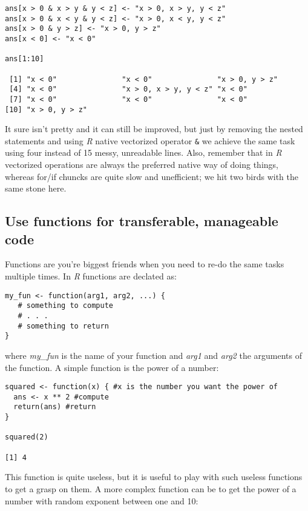 \documentclass{book}
\begin{document}
\begin{lstlisting}[showstringspaces=false]
ans[x > 0 & x > y & y < z] <- "x > 0, x > y, y < z"
ans[x > 0 & x < y & y < z] <- "x > 0, x < y, y < z"
ans[x > 0 & y > z] <- "x > 0, y > z"
ans[x < 0] <- "x < 0"

ans[1:10]

 [1] "x < 0"               "x < 0"               "x > 0, y > z"       
 [4] "x < 0"               "x > 0, x > y, y < z" "x < 0"              
 [7] "x < 0"               "x < 0"               "x < 0"              
[10] "x > 0, y > z"   
\end{lstlisting}

It sure isn't pretty and it can still be improved, but just by removing the nested statements and using \textit{R} native vectorized operator \texttt{\&} we achieve the same task using four instead of 15 messy, unreadable lines. Also, remember that in \textit{R} vectorized operations are always the preferred native way of doing things, whereas for/if chuncks are quite slow and unefficient; we hit two birds with the same stone here.

\subsection{Use functions for transferable, manageable code}

Functions are you're biggest friends when you need to re-do the same tasks multiple times. In \textit{R} functions are declated as:

\begin{lstlisting}[showstringspaces=false]
my_fun <- function(arg1, arg2, ...) {
   # something to compute
   # . . . 
   # something to return
}
\end{lstlisting}

where \textit{my\_fun} is the name of your function and \textit{arg1} and \textit{arg2} the arguments of the function. A simple function is the power of a number:

\begin{lstlisting}[showstringspaces=false]
squared <- function(x) { #x is the number you want the power of
  ans <- x ** 2 #compute
  return(ans) #return
}

squared(2)

[1] 4
\end{lstlisting}

This function is quite useless, but it is useful to play with such useless functions to get a grasp on them. A more complex function can be to get the power of a number with random exponent between one and 10:
\end{document}

